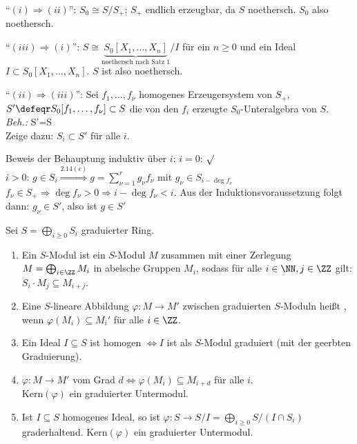 \begin{Bew}
``$(i)\Rightarrow (ii)$'': $S_0\cong S/S_{+}$; $S_{+}$ endlich erzeugbar, da $S$ noethersch.
$S_0$ also noethersch.

``$(iii)\Rightarrow (i)$'': $S\cong \underbrace{S_0[X_1, \ldots, X_n]}_
{\text{noethersch nach Satz 1}}/I$ f\"ur ein $n\geq 0$
und ein Ideal $I\subset S_0[X_1, \ldots, X_n]$. $S$ ist also noethersch.

``$(ii)\Rightarrow (iii)$'': Sei $f_1, \ldots, f_\nu$ homogenes Erzeugersystem von $S_+$, 
$S'\defeqr S_0[f_1, \ldots, f_\nu]\subset S$ die von den $f_i$ erzeugte
$S_0$-Unteralgebra von $S$.\\
\emph{Beh.:} S'=S\\
Zeige dazu: $S_i\subset S'$ f\"ur alle $i$.

Beweis der Behauptung induktiv \"uber $i$:
$i=0$: $\surd$\\
$i> 0$: $g\in S_i\stackrel{2.14(c)}{\Rightarrow}g=\sum_{\nu=1}^{r} g_{\nu}f_\nu$ mit
$g_\nu\in S_{i-\deg{f_\nu}}$\\
$f_\nu\in S_{+} \Rightarrow \deg{f_\nu}> 0 \Rightarrow i-\deg{f_\nu} < i$.
Aus der Induktionsvoraussetzung folgt dann: $g_\nu\in S'$, also ist $g\in S'$
\end{Bew}

\begin{DefBem}
\label{2.16} Sei $S=\bigoplus_{i\geq 0}S_i$ graduierter Ring.
\begin{enumerate}

\item Ein  $S$-Modul ist ein $S$-Modul $M$ zusammen mit
einer Zerlegung $M=\bigoplus_{i\in\ZZ} M_i$ in abelsche Gruppen $M_i$,
sodass f\"ur alle $i\in\NN, j\in\ZZ$  gilt:
$S_i\cdot M_j\subseteq M_{i+j}$.

\item Eine $S$-lineare Abbildung $\varphi:M\to M'$ zwischen graduierten $S$-Moduln
hei\ss t , wenn $\varphi(M_i)\subseteq
M_i'$ f\"ur alle $i\in \ZZ$.

\item Ein Ideal $I\subseteq S$ ist homogen $\Leftrightarrow I$ ist als $S$-Modul
graduiert (mit der geerbten Graduierung).

\item $\varphi: M \to M'$ vom Grad $d \Leftrightarrow \varphi(M_i) \subseteq
      M_{i+d}$ für alle $i$.\\
      Kern$(\varphi)$ ein graduierter Untermodul.
      
\item Ist $I \subseteq S$ homogenes Ideal, so ist $\varphi: S \to S/I =
\bigoplus_{i \ge
0} S/(I \cap S_i)$ graderhaltend. Kern$(\varphi)$ ein graduierter Untermodul.
\end{enumerate}
\end{DefBem}


